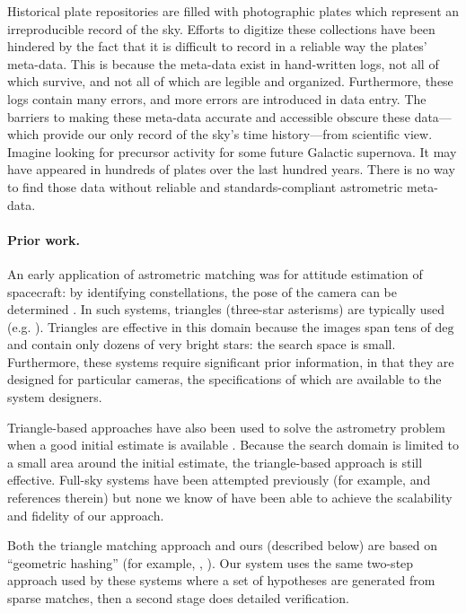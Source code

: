 \documentclass[12pt,preprint]{aastex}
\newcommand{\unit}[1]{\mathrm{#1}}
\renewcommand{\%}{\percent}
\renewcommand{\deg}{\unit{deg}}
\begin{document}
Historical plate repositories are filled with photographic plates
which represent an irreproducible record of the sky.  Efforts to digitize
these collections have been hindered by the fact that it is difficult to
record in a reliable way the plates' meta-data.
This is because the meta-data exist in hand-written logs, not all of
which survive, and not all of which are legible and organized.
Furthermore, these logs contain many errors, and more errors are
introduced in data entry.  The barriers to making these meta-data
accurate and accessible obscure these data---which provide our only
record of the sky's time history---from scientific view.  Imagine
looking for precursor activity for some future Galactic supernova.  It
may have appeared in hundreds of plates over the last hundred years.
There is no way to find those data without reliable and
standards-compliant astrometric meta-data.

\paragraph{Prior work.}
An early application of astrometric matching was for attitude
estimation of spacecraft: by identifying constellations, the pose of
the camera can be determined \citep{liebe1993}.  In such systems,
triangles (three-star asterisms) are typically used
(e.g. \citealt{junkins1977}).  Triangles are effective in this domain
because the images span tens of $\deg$ and contain only dozens of
very bright stars: the search space is small.  Furthermore, these
systems require significant prior information, in that they are designed for
particular cameras, the specifications of which are available to the
system designers.

Triangle-based approaches have also been used to solve the astrometry
problem when a good initial estimate is available \citep{palbakos}.
Because the search domain is limited to a small area around the
initial estimate, the triangle-based approach is still effective.
Full-sky systems have been attempted previously (for example,
\citealt{harvey} and references therein) but none we know of have been
able to achieve the scalability and fidelity of our approach.

Both the triangle matching approach and ours (described below) are
based on ``geometric hashing'' (for example, \citealt{lamdan1990},
\citealt{huttenlocher1990}).  Our system uses the same two-step
approach used by these systems where a set of hypotheses are generated
from sparse matches, then a second stage does detailed verification.
\end{document}
